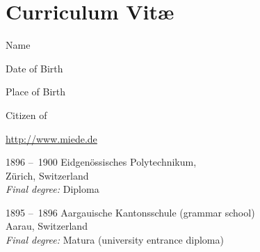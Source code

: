 

\chapter*{Curriculum Vit\ae}
    \pagestyle{plain}
    \begin{cv}{}
        \begin{cvlist}{}\label{PersDat}  %
            \item[Name]   \myName
            \item[Date of Birth] \myDateofBirth
            \item[Place of Birth] \myPlaceofBirth
            \item[Citizen of] \myCitizenship
            \item   \url{http://www.miede.de} 
        \end{cvlist}

        \begin{cvlist}{}\label{Education}
            \item[1896 --~1900]
            Eidgenössisches Polytechnikum, \\
            Zürich, Switzerland\\
            \emph{Final degree:} Diploma
            \item[1895 --~1896]%
            Aargauische Kantonsschule (grammar school)\\
            Aarau, Switzerland \\
            \emph{Final degree:} Matura (university entrance diploma)


\end{cvlist}
\end{cv}
